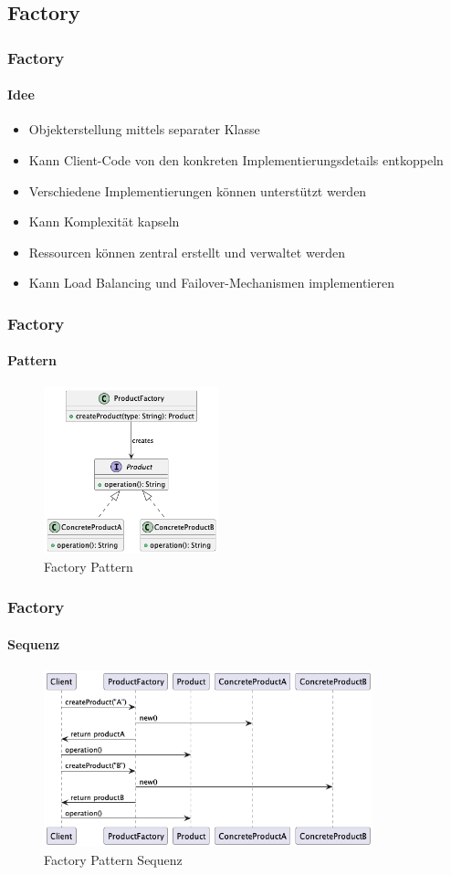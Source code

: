 \subsection{Factory}
\begin{frame}
  \frametitle{Factory}
  \framesubtitle{Idee}
  \begin{itemize}
    \item Objekterstellung mittels separater Klasse
    \item Kann Client-Code von den konkreten Implementierungsdetails entkoppeln
    \item Verschiedene Implementierungen können unterstützt werden
    \item Kann Komplexität kapseln
    \item Ressourcen können zentral erstellt und verwaltet werden
    \item Kann Load Balancing und Failover-Mechanismen implementieren
  \end{itemize}
\end{frame}


\begin{frame}
  \frametitle{Factory}
  \framesubtitle{Pattern}
  \begin{figure}[!ht]
    \centering
    \includegraphics[width=0.45\textwidth]{fig/uml/factory-class.png}
    \caption{Factory Pattern}
    \label{fig:factory-class}
  \end{figure}
\end{frame}

\begin{frame}
  \frametitle{Factory}
  \framesubtitle{Sequenz}
   \begin{figure}[!ht]
    \centering
    \includegraphics[width=0.85\textwidth]{fig/uml/factory-seq.png}
    \caption{Factory Pattern Sequenz}
    \label{fig:factory-seq}
  \end{figure}
\end{frame}

